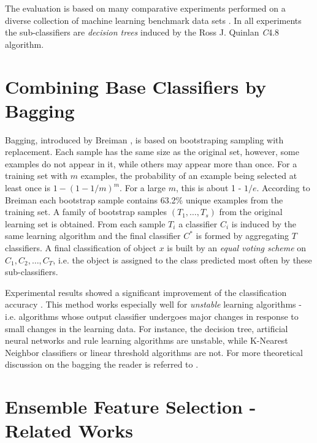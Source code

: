 \documentclass[runningheads]{llncs}
\begin{document}
The evaluation is based on many comparative experiments performed on a
diverse collection of machine learning benchmark data sets \cite{Irvine}. In
all experiments the sub-classifiers are {\em decision trees} induced by the
Ross J. Quinlan {\em C}4.8 algorithm.


\section{Combining Base Classifiers by Bagging}

Bagging, introduced by Breiman \cite{Bre}, is based on bootstraping sampling
with replacement. Each sample has the same size as the original set,
however, some examples do not appear in it, while others may appear more
than once. For a training set with $m$ examples, the probability of an
example being selected at least once is $1 -(1 - 1/m)^m$. For a large $m$,
this is about 1 - $1/e$. According to Breiman \cite{Bre} each bootstrap
sample contains 63.2\% unique examples from the training set. A family of
bootstrap samples $(T_1,\ldots , T_s)$ from the original learning set is
obtained. From each sample $T_i$ a classifier $C_i$ is induced by the same
learning algorithm and the final classifier $C^*$ is formed by aggregating
$T$ classifiers. A final classification of object $x$ is built by an {\em
equal voting scheme} on $C_1,C_2,\ldots,C_T$, i.e. the object is assigned to
the class predicted most often by these sub-classifiers.

Experimental results  showed a significant improvement of the classification
accuracy \cite{BK99,Bre,Dietrich,Stef04}. This method works especially well
for {\em unstable} learning algorithms - i.e. algorithms whose output
classifier undergoes major changes in response to small changes in the
learning data. For instance, the decision tree, artificial neural networks
and rule learning algorithms are unstable, while K-Nearest Neighbor
classifiers or linear threshold algorithms are not. For more theoretical
discussion on the bagging the reader is referred to \cite{Bre}.


\section{Ensemble Feature Selection - Related Works}
\end{document}
